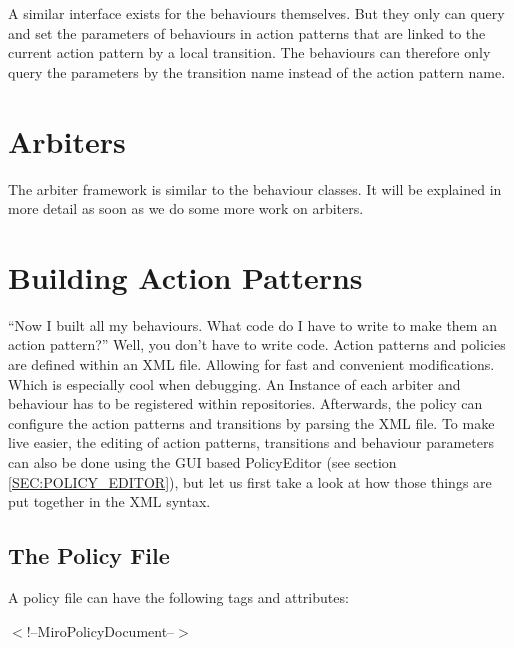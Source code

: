 A similar interface exists for the behaviours themselves. But they only
can query and set the parameters of behaviours in action patterns that
are linked to the current action pattern by a local transition. The
behaviours can therefore only query the parameters by the transition
name instead of the action pattern name.

\section{Arbiters}

The arbiter framework is similar to the behaviour classes. It will be
explained in more detail as soon as we do some more work on arbiters.

\section{Building Action Patterns}

``Now I built all my behaviours. What code do I have to write to make
them an action pattern?'' Well, you don't have to write code. Action
patterns and policies are defined within an XML file. Allowing for
fast and convenient modifications. Which is especially cool when
debugging. An Instance of each arbiter and behaviour has to be
registered within repositories. Afterwards, the policy can configure
the action patterns and transitions by parsing the XML file. 
To make live easier, the editing of action patterns, transitions and
behaviour parameters can also be done using the GUI based PolicyEditor
(see section \ref{SEC:POLICY_EDITOR}), but
let us first take a look at how those things are put together in the
XML syntax.

\subsection{The Policy File}

A policy file can have the following tags and attributes:

$<$!--MiroPolicyDocument--$>$


